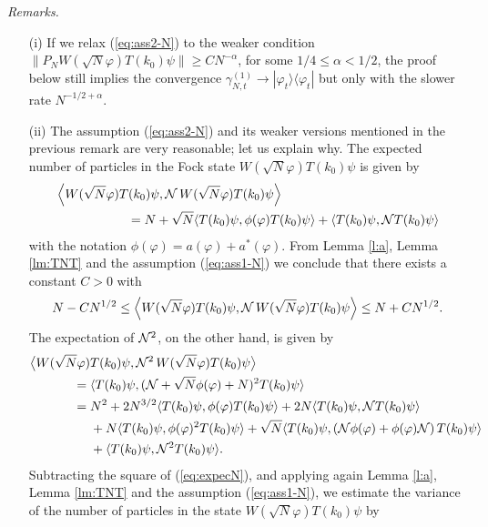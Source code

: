 \documentclass[11pt,a4paper]{article}
\newcommand{\cN}{{\cal N}}
\begin{document}
{\it Remarks. } 
\begin{itemize}
\item[(i)] If we relax (\ref{eq:ass2-N}) to the weaker condition $\| P_N W (\sqrt{N} \varphi) T(k_0) \psi \| \geq C N^{-\alpha}$, for some $1/4 \leq \alpha < 1/2$, the proof below still implies the convergence $\gamma^{(1)}_{N,t} \to |\varphi_t \rangle \langle \varphi_t|$ but only with the slower rate $N^{-1/2+ \alpha}$. 
\item[(ii)] The assumption (\ref{eq:ass2-N}) and its weaker versions mentioned in the previous remark 
are very reasonable; let us explain why. The expected number of particles in the Fock state $W(\sqrt{N} \varphi) T(k_0) \psi$ is given by
\begin{equation}\label{eq:expecN}
\begin{split} &\left\langle W(\sqrt{N} \varphi) T(k_0) \psi , \cN \, W(\sqrt{N} \varphi) T(k_0) \psi \right\rangle \\ & \hspace{2cm}= N + \sqrt{N} \langle T(k_0) \psi , \phi (\varphi) T(k_0) \psi \rangle + \langle T(k_0) \psi , \cN T(k_0) \psi \rangle \end{split} \end{equation}
with the notation $\phi (\varphi) = a(\varphi) + a^* (\varphi)$. {F}rom Lemma \ref{l:a}, Lemma \ref{lm:TNT} and the assumption (\ref{eq:ass1-N}) we conclude that there exists a constant $C >0$ with 
\[ N - CN^{1/2} \leq \left\langle W(\sqrt{N} \varphi) T(k_0) \psi , \cN \,
W(\sqrt{N} \varphi) T(k_0) \psi \right\rangle \leq N + C N^{1/2}. \]
The expectation of $\cN^2$, on the other hand, is given by
\[ \begin{split} 
\big\langle W(\sqrt{N} \varphi) &T(k_0)  \psi , \cN^2 \, W(\sqrt{N} \varphi) T(k_0) \psi \big\rangle \\
= \; &\langle T(k_0) \psi , (\cN + \sqrt{N} \phi (\varphi) + N)^2 T(k_0)
\psi \rangle \\ = \; &N^2 + 2 N^{3/2} \langle T(k_0) \psi , \phi (\varphi)
T(k_0) \psi \rangle + 2N \langle T(k_0) \psi , \cN T(k_0) \psi \rangle \\
&+N \langle  T(k_0) \psi , \phi (\varphi)^2 T(k_0) \psi \rangle + \sqrt{N}
\langle   T(k_0) \psi ,  \left( \cN \phi (\varphi) + \phi (\varphi) \cN
\right) T(k_0) \psi \rangle \\ &+ \langle T(k_0) \psi, \cN^2 T(k_0) \psi
\rangle. \end{split} \]
 Subtracting the square of (\ref{eq:expecN}), and applying again Lemma \ref{l:a}, Lemma \ref{lm:TNT} and the assumption (\ref{eq:ass1-N}), we estimate the variance of the number of particles in the state $W(\sqrt{N} \varphi) T(k_0) \psi$ by

\end{itemize}
\end{document}
